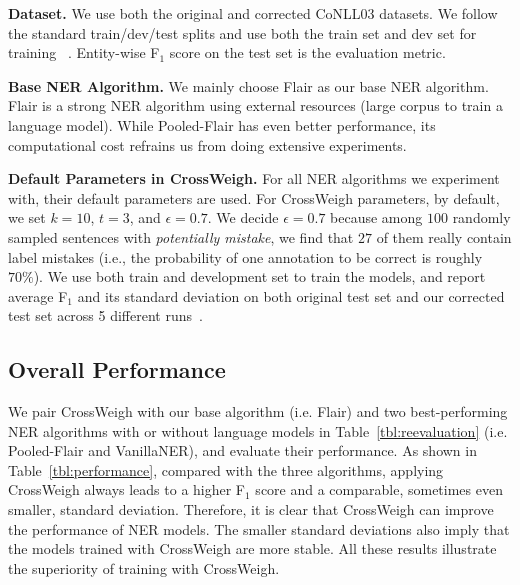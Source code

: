 \documentclass[11pt,a4paper]{article}
\newcommand{\our}{\mbox{\sf CrossWeigh}\xspace}
\newcommand{\smallsection}[1]{{\noindent\textbf{#1.}}}
\begin{document}
        \smallsection{Dataset}
        We use both the original and corrected CoNLL03 datasets.
        We follow the standard train/dev/test splits and use both the train set and dev set for training ~\cite{peters2017semi, akbik2018contextual}.
        Entity-wise F$_1$ score on the test set is the evaluation metric.
    
        \smallsection{Base NER Algorithm}
        We mainly choose Flair as our base NER algorithm. Flair is a strong NER algorithm using external resources (large corpus to train a language model). While Pooled-Flair has even better performance, its computational cost refrains us from doing extensive experiments. 


    
        \smallsection{Default Parameters in \our}
        For all NER algorithms we experiment with, their default parameters are used.  
        For \our parameters, by default, we set $k = 10$, $t = 3$, and $\epsilon = 0.7$. 
We decide $\epsilon = 0.7$ because among $100$ randomly sampled sentences with \textit{potentially mistake}, we find that $27$ of them really contain label mistakes (i.e., the probability of one annotation to be correct is roughly $70\%$). We use both train and development set to train the models, and report average F$_1$ and its standard deviation on both original test set and our corrected test set across 5 different runs~\cite{peters2017semi}. 
    
    \subsection{Overall Performance}
        
        We pair \our with our base algorithm (i.e. Flair) and two best-performing NER algorithms with or without language models in Table~\ref{tbl:reevaluation} (i.e. Pooled-Flair and VanillaNER), and evaluate their performance.
As shown in Table~\ref{tbl:performance}, compared with the three algorithms, applying \our always leads to a higher F$_1$ score and a comparable, sometimes even smaller, standard deviation.
        Therefore, it is clear that \our can improve the performance of NER models. 
        The smaller standard deviations also imply that the models trained with \our are more stable.
        All these results illustrate the superiority of training with \our.
\end{document}
